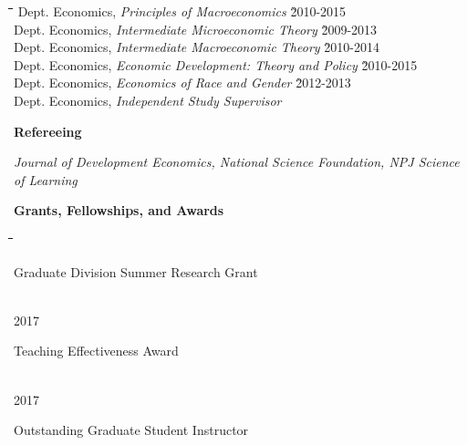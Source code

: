\documentclass[10pt, oneside]{article}
\makeatletter
\newlength\tdima
\newcommand\tabfill[1]{%
      \setlength\tdima{\linewidth}%
      \addtolength\tdima{\@totalleftmargin}%
      \addtolength\tdima{-\dimen\@curtab}%
      \parbox[t]{\tdima}{#1\ifhmode\strut\fi}}
\newcommand\mytabs{\hspace*{1cm}\=\hspace{1cm}\=\hspace{1cm}\=\hspace{1cm}\=\hspace{1cm}\=\hspace{1cm}\=\hspace{1cm}\=\hspace{1cm}\=\hspace{1cm}\=\hspace{1cm}}
\newenvironment{mysec}[1][\mytabs]
  {\begin{tabbing}#1\kill\ignorespaces}
  {\end{tabbing}}
\makeatother
\begin{document}
\begin{minipage}[t]{0.8\linewidth}
\begin{mysec}
\>\>Dept. Economics, \emph{Principles of Macroeconomics}  \`2010-2015\\
\>\>Dept. Economics, \emph{Intermediate Microeconomic Theory}  \`2009-2013\\
\>\>Dept. Economics, \emph{Intermediate Macroeconomic Theory}  \`2010-2014\\
\>\>Dept. Economics, \emph{Economic Development: Theory and Policy}  \`2010-2015\\
\>\>Dept. Economics, \emph{Economics of Race and Gender}  \`2012-2013\\
\>\>Dept. Economics, \emph{Independent Study Supervisor}  
\end{mysec}
\end{minipage}\vspace{5mm}

\begin{minipage}[t]{0.1\linewidth}
\textbf{Refereeing}
\end{minipage}\hspace{0.05\linewidth}
\begin{minipage}[t]{0.8\linewidth}
 \emph{Journal of Development Economics, National Science Foundation, NPJ Science of Learning}
\end{minipage}\vspace{5mm}



\begin{minipage}[t]{0.1\linewidth}
\textbf{Grants, Fellowships, and Awards}
\end{minipage}\hspace{0.05\linewidth}
\begin{minipage}[t]{0.8\linewidth}
\begin{mysec} 
	2018 \>\>\tabfill{Graduate Division Summer Research Grant} \\
	2017 \>\>\tabfill{Teaching Effectiveness Award}\\
	2017 \>\>\tabfill{Outstanding Graduate Student Instructor}
\end{mysec} 
\end{minipage}\vspace{5mm}
\end{document}
